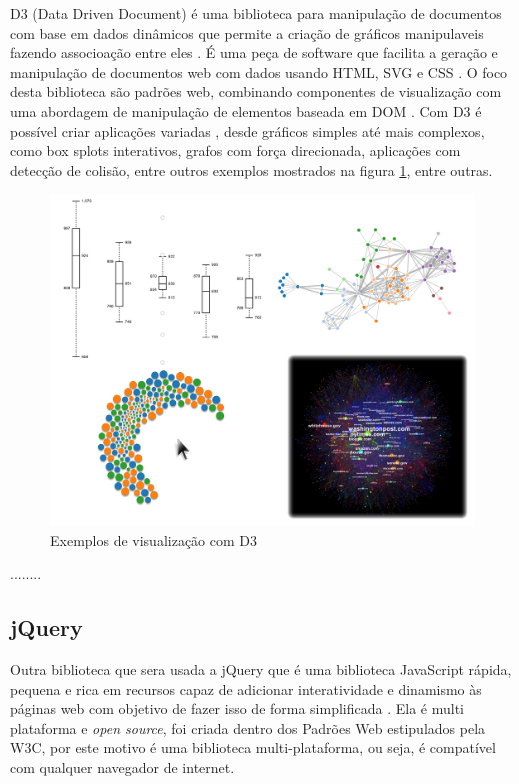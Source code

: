 D3 (Data Driven Document) é uma biblioteca para manipulação de documentos com base em dados dinâmicos que permite a criação de gráficos manipulaveis fazendo associoação entre eles \cite{d3site} \cite{zhu2013data}.  É  uma peça de software que facilita a geração e manipulação de documentos web com dados usando HTML, SVG e CSS \cite{murray2013interactive}. O foco desta biblioteca são padrões web, combinando componentes de visualização com uma abordagem de manipulação de elementos baseada em DOM\cite{d3site} . Com D3 é possível criar aplicações variadas \cite{d3site}, desde gráficos simples até mais complexos, como  box splots interativos, grafos com força direcionada, aplicações com detecção de colisão, entre outros exemplos mostrados na figura \ref{fig:d3exemplos},  entre outras. 

\begin{figure}[!ht]
	\centering
	\includegraphics[width=1\columnwidth]{images/D3jsexemplos.png}
	\caption{Exemplos de visualização com D3  \cite{d3site}}
	\label{fig:d3exemplos}
\end{figure}

........

\subsection{jQuery}

Outra biblioteca que sera usada a jQuery que é uma biblioteca JavaScript rápida, pequena e rica em recursos capaz de adicionar interatividade e dinamismo às páginas web com objetivo de fazer isso de forma simplificada \cite{bibeault2008jquery}. Ela é multi plataforma e \textit{open source}\cite{bibeault2008jquery}, foi criada dentro dos Padrões Web estipulados pela W3C, por este motivo é uma biblioteca multi-plataforma, ou seja, é compatível com qualquer navegador de internet.

